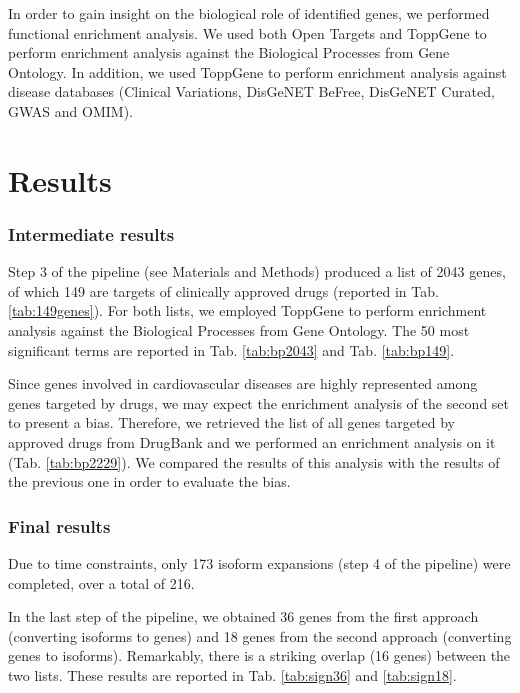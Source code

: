 \documentclass[fleqn,10pt]{SelfArx} %
\begin{document}
In order to gain insight on the biological role of identified genes, we performed functional enrichment analysis. We used both Open Targets and ToppGene to perform enrichment analysis against the Biological Processes from Gene Ontology. In addition, we used ToppGene to perform enrichment analysis against disease databases (Clinical Variations, DisGeNET BeFree, DisGeNET Curated, GWAS and OMIM).

\section*{Results}

\subsubsection*{Intermediate results}
Step 3 of the pipeline (see Materials and Methods) produced a list of 2043 genes, of which 149 are targets of clinically approved drugs (reported in Tab. \ref{tab:149genes}). For both lists, we employed ToppGene to perform enrichment analysis against the Biological Processes from Gene Ontology. The 50 most significant terms are reported in Tab. \ref{tab:bp2043} and Tab. \ref{tab:bp149}.

Since genes involved in cardiovascular diseases are highly represented among genes targeted by drugs, we may expect the enrichment analysis of the second set to present a bias. Therefore, we retrieved the list of all genes targeted by approved drugs from DrugBank and we performed an enrichment analysis on it (Tab. \ref{tab:bp2229}). We compared the results of this analysis with the results of the previous one in order to evaluate the bias.

\subsubsection*{Final results}

Due to time constraints, only 173 isoform expansions (step 4 of the pipeline) were completed, over a total of 216.

In the last step of the pipeline, we obtained 36 genes from the first approach (converting isoforms to genes) and 18 genes from the second approach (converting genes to isoforms). Remarkably, there is a striking overlap (16 genes) between the two lists. These results are reported in Tab. \ref{tab:sign36} and \ref{tab:sign18}.
\end{document}
